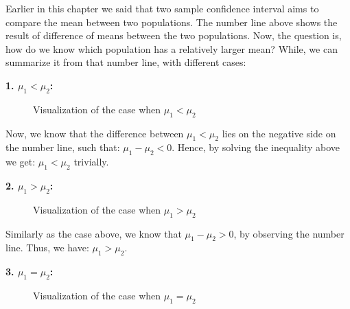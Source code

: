 Earlier in this chapter we said that two sample confidence interval aims to compare the mean between two populations. The number line above shows the result of difference of means between the two populations. Now, the question is, how do we know which population has a relatively larger mean? While, we can summarize it from that number line, with different cases:

\textbf{1. $\mu_1 < \mu_2$:}

\begin{figure}[h!]
\begin{center}
\end{center}
\caption{Visualization of the case when $\mu_1 < \mu_2$}
\end{figure}

Now, we know that the difference between $\mu_1 < \mu_2$ lies on the negative side on the number line, such that: $\mu_1 - \mu_2 < 0$. Hence, by solving the inequality above we get: $\mu_1 < \mu_2$ trivially.

\textbf{2. $\mu_1 > \mu_2$:}

\begin{figure}[h!]
\begin{center}
\end{center}
\caption{Visualization of the case when $\mu_1 > \mu_2$}
\end{figure}

Similarly as the case above, we know that $\mu_1 - \mu_2 > 0$, by observing the number line. Thus, we have: $\mu_1 > \mu_2$.

\textbf{3. $\mu_1 = \mu_2$:}

\begin{figure}[h!]
\begin{center}
\end{center}
\caption{Visualization of the case when $\mu_1 = \mu_2$}
\end{figure}

